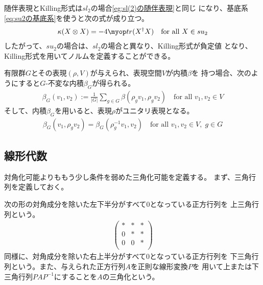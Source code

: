 {	\begin{example}[su(2)]\label{eg:su(2)の随伴表現} %
		随伴表現とKilling形式は$sl_2$の場合\ref{eg:sl(2)の随伴表現}と同じ
		になり、基底系\eqref{eq:su2の基底系}を使うと次の式が成り立つ。
		\begin{equation*}\begin{split}
			\kappa(X\otimes X) = - 4\tr(X^\dag X) \quad\text{for all } X\in su_2
		\end{split}\end{equation*}
		したがって、$su_2$の場合は、$sl_2$の場合と異なり、Killing形式が負定値
		となり、Killing形式を用いてノルムを定義することができる。
	\end{example} %

	\begin{todo}[ここまで]\label{todo:ここまで} %
		有限群$G$とその表現$(\rho,V)$が与えられ、表現空間$V$が内積$\beta$を
		持つ場合、次のようにすると$G$-不変な内積$\beta_G$が得られる。
		\begin{equation*}\begin{split}
			\beta_G(v_1, v_2) 
			:= \frac{1}{|G|}\sum_{g\in G} \beta(\rho_gv_1, \rho_gv_2)
			\quad\text{for all } v_1,v_2\in V
		\end{split}\end{equation*}
		そして、内積$\beta_G$を用いると、表現$\rho$がユニタリ表現となる。
		\begin{equation*}\begin{split}
			\beta_G(v_1, \rho_gv_2) = \beta_G(\rho_g^{-1}v_1, v_2)
			\quad\text{for all } v_1,v_2\in V,\; g\in G
		\end{split}\end{equation*}
	\end{todo} %
\subsection{線形代数}\label{s2:線形代数} %
	対角化可能よりももう少し条件を弱めた三角化可能を定義する。
	まず、三角行列を定義しておく。

	\begin{definition}[三角行列]\label{def:三角行列} %
		次の形の対角成分を除いた左下半分がすべて$0$となっている正方行列を
		上三角行列という。
		\begin{equation*}\begin{split}
			\begin{pmatrix}
				* & * & * \\
				0 & * & * \\
				0 & 0 & * \\
			\end{pmatrix}
		\end{split}\end{equation*}
		同様に、対角成分を除いた右上半分がすべて$0$となっている正方行列を
		下三角行列という。また、与えられた正方行列$A$を正則な線形変換$P$を
		用いて上または下三角行列$PAP^{-1}$にすることを$A$の三角化という。
	\end{definition} %

}
